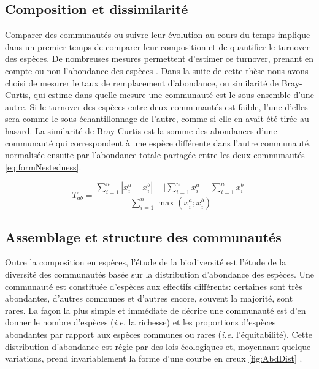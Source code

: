 \documentclass[
  11pt,
  french,
  A4paper,
  extrafontsizes,onecolumn,openright
  ]{memoir}
\begin{document}
\subsection{Composition et
dissimilarité}\label{composition-et-dissimilarite}

Comparer des communautés ou suivre leur évolution au cours du temps
implique dans un premier temps de comparer leur composition et de
quantifier le turnover des espèces. De nombreuses mesures permettent
d'estimer ce turnover, prenant en compte ou non l'abondance des espèces
\autocite{Podani2013}. Dans la suite de cette thèse nous avons choisi de
mesurer le taux de remplacement d'abondance, ou similarité de
Bray-Curtis, qui estime dans quelle mesure une communauté est le
sous-ensemble d'une autre. Si le turnover des espèces entre deux
communautés est faible, l'une d'elles sera comme le sous-échantillonnage
de l'autre, comme si elle en avait été tirée au hasard. La similarité de
Bray-Curtis est la somme des abondances d'une communauté qui
correspondent à une espèce différente dans l'autre communauté,
normalisée ensuite par l'abondance totale partagée entre les deux
communautés \eqref{eq:formNestedness}.

\begin{equation}
T_{ab}=\frac{\sum_{i=1}^{n}|x_i^a - x_i^b| - \bigg| \sum_{i=1}^{n}{x_i^a} - \sum_{i=1}^{n}{x_i^b} \bigg|}{\sum_{i=1}^{n}\max{\left( x_i^a;x_i^b \right)}}
\label{eq:formNestedness}
\end{equation}

\subsection{Assemblage et structure des
communautés}\label{assemblage-et-structure-des-communautes}

Outre la composition en espèces, l'étude de la biodiversité est l'étude
de la diversité des communautés basée sur la distribution d'abondance
des espèces. Une communauté est constituée d'espèces aux effectifs
différents: certaines sont très abondantes, d'autres communes et
d'autres encore, souvent la majorité, sont rares. La façon la plus
simple et immédiate de décrire une communauté est d'en donner le nombre
d'espèces (\emph{i.e.} la richesse) et les proportions d'espèces
abondantes par rapport aux espèces communes ou rares (\emph{i.e.}
l'équitabilité). Cette distribution d'abondance est régie par des lois
écologiques et, moyennant quelque variations, prend invariablement la
forme d'une courbe en creux \ref{fig:AbdDist} \autocite{McGill2007}.
\end{document}
